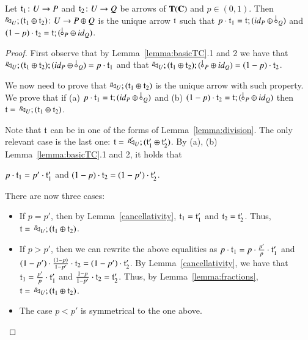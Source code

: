 \begin{lemma}\label{lemma:comvexproductpreliminary}
Let $\mathfrak{t}_1\colon U\to P$ and $\mathfrak{t}_2\colon U \to Q$ be arrows of $\mathbf{T}(\mathbf{C})$ and $p\in (0,1)$. Then $^p\!\! \lhd_{U}; (\mathfrak{t}_1 \oplus \mathfrak{t}_2) \colon U \to P\oplus Q$ is the unique arrow $\mathfrak{t}$ such that
$p\cdot \t_1 = \t; (\id{P} \oplus \bang{Q})$ and $(1-p)\cdot \t_2 = \t; (\bang{P} \oplus \id{Q})$.
\end{lemma}
\begin{proof}
First observe that by Lemma~\ref{lemma:basicTC}.1 and 2 we have that $\diagp{U}; (\t_1 \oplus \t_2) ; (\id{P} \oplus \bang{Q}) = p\cdot \t_1$ and that $\diagp{U}; (\t_1 \oplus \t_2) ; (\bang{P} \oplus \id{Q}) = (1-p) \cdot \t_2$.

We now need to prove that $^p\!\! \lhd_{U}; (\mathfrak{t}_1 \oplus \mathfrak{t}_2)$ is the unique arrow with such property.  We prove that if (a) $p\cdot \t_1 = \t; (\id{P} \oplus \bang{Q})$ and (b) $(1-p)\cdot \t_2 = \t; (\bang{P} \oplus \id{Q})$ then $\mathfrak{t} =\, ^p\!\! \lhd_{U}; (\mathfrak{t}_1 \oplus \mathfrak{t}_2)$.

Note that $\mathfrak{t}$ can be in one of the forms of Lemma~\ref{lemma:division}. The only relevant case is the last one: $\mathfrak{t} =\, ^{p'}\!\!\! \lhd_{U} ; (\mathfrak{t}_1' \oplus 	\mathfrak{t}_2')$. By (a), (b) Lemma~\ref{lemma:basicTC}.1 and 2, it holds that 
\begin{center}$p\cdot \mathfrak{t}_1 = p' \cdot \mathfrak{t}_1'$ and  $(1-p)\cdot \mathfrak{t}_2 = (1-p') \cdot \mathfrak{t}_2'$. \end{center}

There are now three cases:
\begin{itemize}
\item If $p=p'$, then by Lemma~\ref{cancellativity}, $\mathfrak{t}_1=\mathfrak{t}_1'$ and $\mathfrak{t}_2=\mathfrak{t}_2'$. Thus, $\mathfrak{t} =\, ^p\!\! \lhd_{U}; (\mathfrak{t}_1 \oplus \mathfrak{t}_2) $.
\item If $p>p'$, then we can rewrite the above equalities as  $p\cdot \mathfrak{t}_1 = p \cdot \frac{p'}{p} \cdot \mathfrak{t}_1'$ and $(1-p')\cdot\frac{(1-p)}{1-p'}\cdot \mathfrak{t}_2 = (1-p') \cdot \mathfrak{t}_2'$. By Lemma~\ref{cancellativity}, we have that $\mathfrak{t}_1=\frac{p'}{p}\cdot\mathfrak{t}_1'$ and $\frac{1-p}{1-p'} \cdot \mathfrak{t}_2 =\mathfrak{t}_2'$. Thus, by Lemma~\ref{lemma:fractions}, $\mathfrak{t}=\, ^p\!\! \lhd_{U}; (\mathfrak{t}_1 \oplus \mathfrak{t}_2)$.
\item The case $p<p'$ is symmetrical to the one above.
\end{itemize}
\end{proof}

